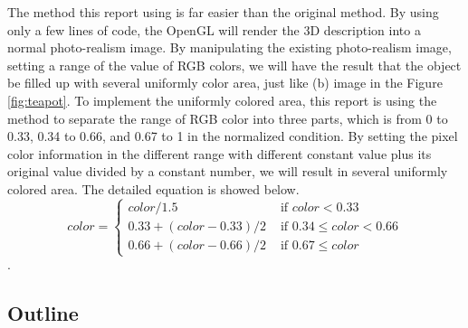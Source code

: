 \documentclass{acmsiggraph}               %
\begin{document}
The method this report using is far easier than the original method. By using only a few lines of code, the OpenGL will render the 3D description into a normal photo-realism image. By manipulating the existing photo-realism image, setting a range of the value of RGB colors, we will have the result that the object be filled up with several uniformly color area, just like (b) image in the Figure \ref{fig:teapot}. To implement the uniformly colored area, this report is using the method to separate the range of RGB color into three parts, which is from 0 to 0.33, 0.34 to 0.66, and 0.67 to 1 in the normalized condition. By setting the pixel color information in the different range with different constant value plus its original value divided by a constant number, we will result in several uniformly colored area. The detailed equation is showed below.
\begin{equation}
color= \left\{ \begin{array}{ll} color / 1.5 & \textrm{ if $color < 0.33$} \\
 0.33 + (color - 0.33) / 2 & \textrm{ if $0.34 \le color < 0.66$}
\\ 0.66 + (color - 0.66)/2 & \textrm{ if $0.67 \le color$} 
\end{array} \right.  \label{eq:color_set}
\end{equation}.
\subsection{Outline}
\label{sec:outlineimp}
\end{document}
